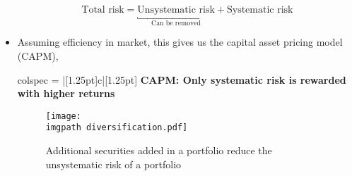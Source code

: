 \documentclass[../notes_compiled.tex]{subfiles}
\begin{document}
\begin{itemize}
\begin{equation}
\text{Total risk} = \underbracket{\text{Unsystematic risk}}_{\text{Can be removed}} + \text{Systematic risk}
\end{equation}
\item Assuming efficiency in market, this gives us the capital asset pricing model (CAPM),
\begin{table}[h!]
\centering
\begin{tblr}{colspec = {|[1.25pt]c|[1.25pt]}}
\hline[1.25pt]
\textbf{CAPM: Only systematic risk is rewarded with higher returns} \\ \hline[1.25pt]
\end{tblr}
\end{table}
\vspace{-.75cm}
\begin{figure}[h]
  \centering
  \texttt{[image: \\imgpath diversification.pdf]}
  \caption{Additional securities added in a portfolio reduce the unsystematic risk of a portfolio}
\end{figure}
\end{itemize}
\end{document}
